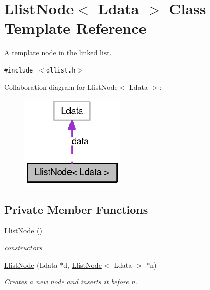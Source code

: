 \hypertarget{classLlistNode}{
\section{LlistNode$<$ Ldata $>$ Class Template Reference}
\label{classLlistNode}
}
A template node in the linked list.  


{\tt \#include $<$dllist.h$>$}

Collaboration diagram for LlistNode$<$ Ldata $>$:\nopagebreak
\begin{figure}[H]
\begin{center}
\leavevmode
\includegraphics[width=142pt]{classLlistNode__coll__graph}
\end{center}
\end{figure}
\subsection*{Private Member Functions}
\begin{CompactItemize}
\item 
\hyperlink{classLlistNode_9e537419faf945c1be64fb8a994773f3}{LlistNode} ()
\begin{CompactList}\small\item\em constructors \item\end{CompactList}\item 
\hyperlink{classLlistNode_0257863d0b35acbdac9e297cadf90a04}{LlistNode} (Ldata $\ast$d, \hyperlink{classLlistNode}{LlistNode}$<$ Ldata $>$ $\ast$n)
\begin{CompactList}\small\item\em Creates a new node and inserts it before n. \item\end{CompactList}\end{CompactItemize}
